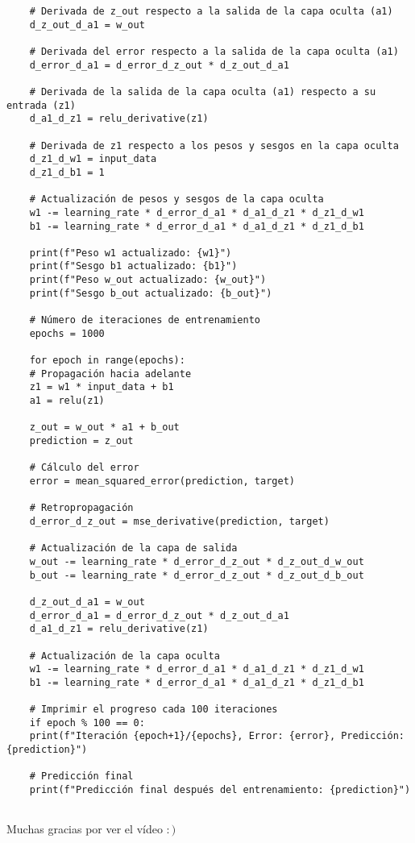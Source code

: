 \documentclass{article}
\begin{document}
\begin{verbatim}
	# Derivada de z_out respecto a la salida de la capa oculta (a1)
	d_z_out_d_a1 = w_out
	
	# Derivada del error respecto a la salida de la capa oculta (a1)
	d_error_d_a1 = d_error_d_z_out * d_z_out_d_a1
	
	# Derivada de la salida de la capa oculta (a1) respecto a su entrada (z1)
	d_a1_d_z1 = relu_derivative(z1)
	
	# Derivada de z1 respecto a los pesos y sesgos en la capa oculta
	d_z1_d_w1 = input_data
	d_z1_d_b1 = 1
	
	# Actualización de pesos y sesgos de la capa oculta
	w1 -= learning_rate * d_error_d_a1 * d_a1_d_z1 * d_z1_d_w1
	b1 -= learning_rate * d_error_d_a1 * d_a1_d_z1 * d_z1_d_b1
	
	print(f"Peso w1 actualizado: {w1}")
	print(f"Sesgo b1 actualizado: {b1}")
	print(f"Peso w_out actualizado: {w_out}")
	print(f"Sesgo b_out actualizado: {b_out}")
	
	# Número de iteraciones de entrenamiento
	epochs = 1000
	
	for epoch in range(epochs):
	# Propagación hacia adelante
	z1 = w1 * input_data + b1
	a1 = relu(z1)
	
	z_out = w_out * a1 + b_out
	prediction = z_out
	
	# Cálculo del error
	error = mean_squared_error(prediction, target)
	
	# Retropropagación
	d_error_d_z_out = mse_derivative(prediction, target)
	
	# Actualización de la capa de salida
	w_out -= learning_rate * d_error_d_z_out * d_z_out_d_w_out
	b_out -= learning_rate * d_error_d_z_out * d_z_out_d_b_out
	
	d_z_out_d_a1 = w_out
	d_error_d_a1 = d_error_d_z_out * d_z_out_d_a1
	d_a1_d_z1 = relu_derivative(z1)
	
	# Actualización de la capa oculta
	w1 -= learning_rate * d_error_d_a1 * d_a1_d_z1 * d_z1_d_w1
	b1 -= learning_rate * d_error_d_a1 * d_a1_d_z1 * d_z1_d_b1
	
	# Imprimir el progreso cada 100 iteraciones
	if epoch % 100 == 0:
	print(f"Iteración {epoch+1}/{epochs}, Error: {error}, Predicción: {prediction}")
	
	# Predicción final
	print(f"Predicción final después del entrenamiento: {prediction}")
	
\end{verbatim}

Muchas gracias por ver el vídeo $:)$
\end{document}
